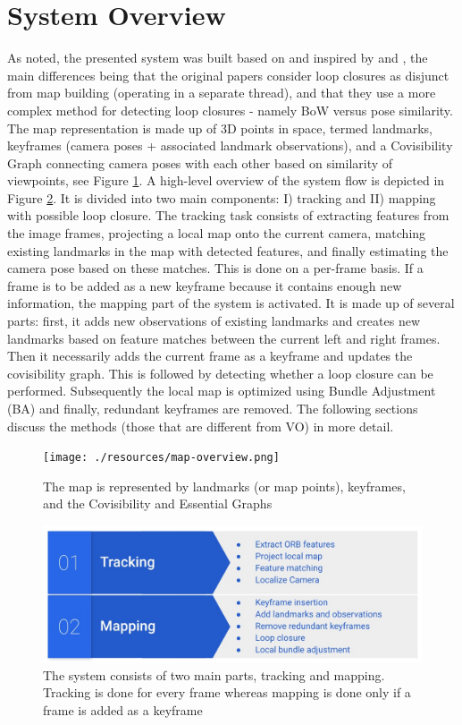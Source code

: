 \documentclass[a4paper, 10pt]{article}
\begin{document}
\section{System Overview}
\label{sec:org7b77409}
As noted, the presented system was built based on and inspired by \cite{os} and \cite{os-II},
the main differences being that the original papers consider loop closures as disjunct from map building (operating in a separate thread), and that they use a more complex method for detecting loop closures - namely BoW versus pose similarity. 
The map representation is made up of 3D points in space, termed landmarks, keyframes (camera poses + associated landmark observations), and a Covisibility Graph connecting camera poses with each other based on 
similarity of viewpoints, see Figure \ref{fig:org9dcb9cf}.
A high-level overview of the system flow is depicted in Figure \ref{fig:org402b489}. It is divided into two main components: I) tracking and II) mapping with possible loop closure.
The tracking task consists of extracting features from the image frames, projecting a local map onto the current camera, matching existing landmarks in the map with detected features, 
and finally estimating the camera pose based on these matches.
This is done on a per-frame basis. If a frame is to be added as a new keyframe because it contains enough new information, the mapping part of the system is activated.
It is made up of several parts: first, it adds new observations of existing landmarks and creates new landmarks based on feature matches between the current left and right frames.
Then it necessarily adds the current frame as a keyframe and updates the covisibility graph. This is followed by detecting whether a loop closure can be performed.
Subsequently the local map is optimized using Bundle Adjustment (BA) \cite{ba} and finally, redundant keyframes are removed. The following sections discuss the methods (those that are different from VO) in more detail.

\begin{figure}[htbp]
\centering
\texttt{[image: ./resources/map-overview.png]}
\caption{\label{fig:org9dcb9cf}
The map is represented by landmarks (or map points), keyframes, and the Covisibility and Essential Graphs}
\end{figure}

\begin{figure}[htbp]
\centering
\includegraphics[width=0.7\linewidth]{./resources/system.jpeg}
\caption{\label{fig:org402b489}
The system consists of two main parts, tracking and mapping. Tracking is done for every frame whereas mapping is done only if a frame is added as a keyframe}
\end{figure}
\end{document}
